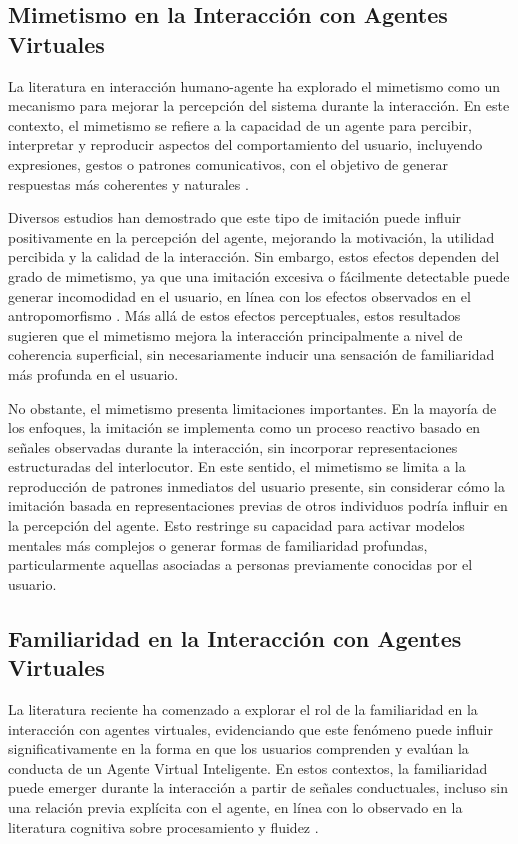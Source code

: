 \documentclass[12pt]{article}
\begin{document}
\subsection{Mimetismo en la Interacción con Agentes Virtuales}

La literatura en interacción humano-agente ha explorado el mimetismo como un mecanismo para mejorar la percepción del sistema durante la interacción. En este contexto, el mimetismo se refiere a la capacidad de un agente para percibir, interpretar y reproducir aspectos del comportamiento del usuario, incluyendo expresiones, gestos o patrones comunicativos, con el objetivo de generar respuestas más coherentes y naturales \cite{caridakis_virtual_2007}.

Diversos estudios han demostrado que este tipo de imitación puede influir positivamente en la percepción del agente, mejorando la motivación, la utilidad percibida y la calidad de la interacción. Sin embargo, estos efectos dependen del grado de mimetismo, ya que una imitación excesiva o fácilmente detectable puede generar incomodidad en el usuario, en línea con los efectos observados en el antropomorfismo \cite{wang_stop_2023}. Más allá de estos efectos perceptuales, estos resultados sugieren que el mimetismo mejora la interacción principalmente a nivel de coherencia superficial, sin necesariamente inducir una sensación de familiaridad más profunda en el usuario.

No obstante, el mimetismo presenta limitaciones importantes. En la mayoría de los enfoques, la imitación se implementa como un proceso reactivo basado en señales observadas durante la interacción, sin incorporar representaciones estructuradas del interlocutor. En este sentido, el mimetismo se limita a la reproducción de patrones inmediatos del usuario presente, sin considerar cómo la imitación basada en representaciones previas de otros individuos podría influir en la percepción del agente. Esto restringe su capacidad para activar modelos mentales más complejos o generar formas de familiaridad profundas, particularmente aquellas asociadas a personas previamente conocidas por el usuario.


\subsection{Familiaridad en la Interacción con Agentes Virtuales}

La literatura reciente ha comenzado a explorar el rol de la familiaridad en la interacción con agentes virtuales, evidenciando que este fenómeno puede influir significativamente en la forma en que los usuarios comprenden y evalúan la conducta de un Agente Virtual Inteligente. En estos contextos, la familiaridad puede emerger durante la interacción a partir de señales conductuales, incluso sin una relación previa explícita con el agente, en línea con lo observado en la literatura cognitiva sobre procesamiento y fluidez \cite{kelley_subjective_1998, wagner_relationship_1998}.
\end{document}
